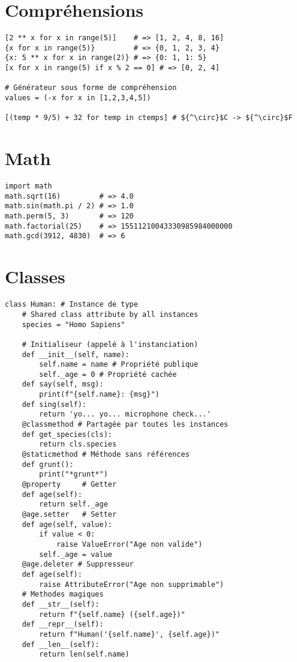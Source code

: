 \documentclass{article}
\begin{document}
\begin{multicols*}{4}
\section*{Compréhensions}
\begin{lstlisting}[mathescape]
[2 ** x for x in range(5)]    # => [1, 2, 4, 8, 16]
{x for x in range(5)}         # => {0, 1, 2, 3, 4}
{x: 5 ** x for x in range(2)} # => {0: 1, 1: 5}
[x for x in range(5) if x % 2 == 0] # => [0, 2, 4]

# Générateur sous forme de compréhension
values = (-x for x in [1,2,3,4,5])

[(temp * 9/5) + 32 for temp in ctemps] # ${^\circ}$C -> ${^\circ}$F
\end{lstlisting}

\section*{Math}
\begin{lstlisting}
import math
math.sqrt(16)         # => 4.0
math.sin(math.pi / 2) # => 1.0
math.perm(5, 3)       # => 120
math.factorial(25)    # => 15511210043330985984000000
math.gcd(3912, 4830)  # => 6
\end{lstlisting}

\section*{Classes}
\begin{lstlisting}
class Human: # Instance de type
    # Shared class attribute by all instances
    species = "Homo Sapiens"

    # Initialiseur (appelé à l'instanciation)
    def __init__(self, name):
        self.name = name # Propriété publique
        self._age = 0 # Propriété cachée
    def say(self, msg):
        print(f"{self.name}: {msg}")
    def sing(self):
        return 'yo... yo... microphone check...'
    @classmethod # Partagée par toutes les instances
    def get_species(cls):
        return cls.species
    @staticmethod # Méthode sans références
    def grunt():
        print("*grunt*")
    @property     # Getter
    def age(self):
        return self._age
    @age.setter   # Setter
    def age(self, value):
        if value < 0:
            raise ValueError("Age non valide")
        self._age = value
    @age.deleter # Suppresseur
    def age(self):
        raise AttributeError("Age non supprimable")
    # Methodes magiques
    def __str__(self):
        return f"{self.name} ({self.age})"
    def __repr__(self):
        return f"Human('{self.name}', {self.age})"
    def __len__(self):
        return len(self.name)


\end{lstlisting}
\end{multicols*}
\end{document}
